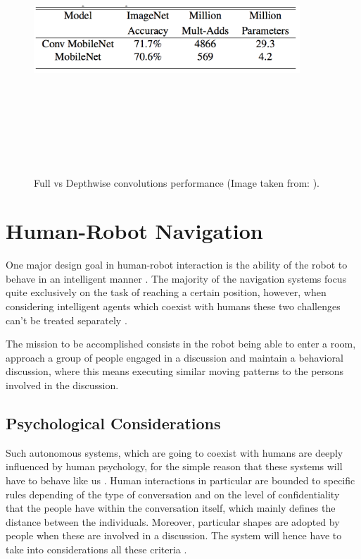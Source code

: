 \begin{figure}[!htbp]
\begin{center}
\includegraphics[width=10cm,height=10cm,keepaspectratio]{images/mobileNet_table.png}
\end{center}
\caption{Full vs Depthwise convolutions performance (Image taken from: \cite{paper:MobileNets}).}
\end{figure}

\section{Human-Robot Navigation}

One major design goal in human-robot interaction is the ability of the robot to behave in an intelligent manner \cite{paper:JOINDISCUSSION}. The majority of the navigation systems focus quite exclusively on the task of reaching a certain position, however, when considering intelligent agents which coexist with humans these two challenges can't be treated separately \cite{paper:JOINDISCUSSION}.

The mission to be accomplished consists in the robot being able to enter a room, approach a group of people engaged in a discussion and maintain a behavioral discussion, where this means executing similar moving patterns to the persons involved in the discussion.

\subsection{Psychological Considerations}

Such autonomous systems, which are going to coexist with humans are deeply influenced by human psychology, for the simple reason that these systems will have to behave like us \cite{paper:JOINDISCUSSION}. Human interactions in particular are bounded to specific rules depending of the type of conversation and on the level of confidentiality that the people have within the conversation itself, which mainly defines the distance between the individuals. Moreover, particular shapes are adopted by people when these are involved in a discussion. The system will hence have to take into considerations all these criteria \cite{paper:JOINDISCUSSION}.

